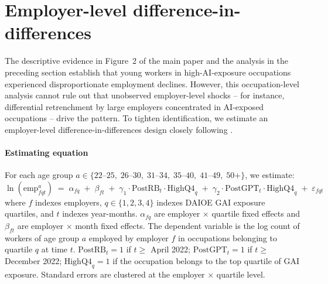 \documentclass[preprint,12pt,authoryear]{elsarticle}
\begin{document}
\section{Employer-level difference-in-differences}
\label{sec:employer_did}

The descriptive evidence in Figure~2 of the main paper and the analysis in the preceding section establish that young workers in high-AI-exposure occupations experienced disproportionate employment declines. However, this occupation-level analysis cannot rule out that unobserved employer-level shocks -- for instance, differential retrenchment by large employers concentrated in AI-exposed occupations -- drive the pattern. To tighten identification, we estimate an employer-level difference-in-differences design closely following \citet{brynjolfsson2025canaries}.

\paragraph{Estimating equation}
For each age group $a \in \{22\text{--}25,\; 26\text{--}30,\; 31\text{--}34,\; 35\text{--}40,\; 41\text{--}49,\; 50+\}$, we estimate:
\begin{equation}\label{eq:employer_did}
\ln(\text{emp}^{a}_{fqt}) \;=\; \alpha_{fq} \;+\; \beta_{ft} \;+\; \gamma_1 \cdot \text{PostRB}_t \cdot \text{HighQ4}_q \;+\; \gamma_2 \cdot \text{PostGPT}_t \cdot \text{HighQ4}_q \;+\; \varepsilon_{fqt}
\end{equation}
where $f$ indexes employers, $q \in \{1,2,3,4\}$ indexes DAIOE GAI exposure quartiles, and $t$ indexes year-months. $\alpha_{fq}$ are employer $\times$ quartile fixed effects and $\beta_{ft}$ are employer $\times$ month fixed effects. The dependent variable is the log count of workers of age group $a$ employed by employer $f$ in occupations belonging to quartile $q$ at time $t$. $\text{PostRB}_t = 1$ if $t \geq$ April 2022; $\text{PostGPT}_t = 1$ if $t \geq$ December 2022; $\text{HighQ4}_q = 1$ if the occupation belongs to the top quartile of GAI exposure. Standard errors are clustered at the employer $\times$ quartile level.
\end{document}
